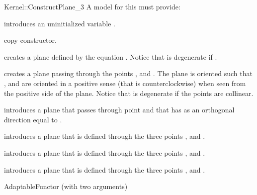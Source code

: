 \begin{ccRefFunctionObjectConcept}{Kernel::ConstructPlane_3}
A model for this must provide:


\ccHidden {}
             {introduces an uninitialized variable .}

\ccHidden {}
            {copy constructor.}

{creates a plane  defined by the equation
 .
Notice that  is degenerate if .}

{creates a plane  passing through the points ,
  and . The plane is oriented such that , 
  and  are oriented in a positive sense 
 (that is counterclockwise) when seen from the positive side of the plane.
Notice that  is degenerate if the points are collinear.}


{introduces a plane  that passes through point  and
 that has as an orthogonal direction equal to .}

{introduces a plane  that is defined through the  three points 
 ,  and .}

{introduces a plane  that is defined through the  three points 
 ,  and .}

{introduces a plane  that is defined through the  three points 
 ,  and .}

\ccRefines
AdaptableFunctor (with two arguments)

\ccSeeAlso
{} \\

\end{ccRefFunctionObjectConcept}
